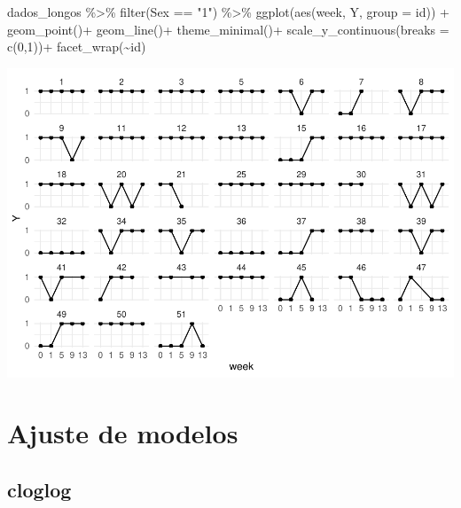 \documentclass[
]{article}
\newenvironment{Shaded}{\begin{snugshade}}{\end{snugshade}}
\newcommand{\AttributeTok}[1]{\textcolor[rgb]{0.80,0.80,0.80}{#1}}
\newcommand{\DecValTok}[1]{\textcolor[rgb]{0.86,0.86,0.80}{#1}}
\newcommand{\FunctionTok}[1]{\textcolor[rgb]{0.94,0.94,0.56}{#1}}
\newcommand{\NormalTok}[1]{\textcolor[rgb]{0.80,0.80,0.80}{#1}}
\newcommand{\OtherTok}[1]{\textcolor[rgb]{0.94,0.94,0.56}{#1}}
\newcommand{\SpecialCharTok}[1]{\textcolor[rgb]{0.86,0.64,0.64}{#1}}
\newcommand{\StringTok}[1]{\textcolor[rgb]{0.80,0.58,0.58}{#1}}
\begin{document}
\begin{Shaded}
\begin{Highlighting}[]
\NormalTok{dados\_longos }\SpecialCharTok{\%\textgreater{}\%} \FunctionTok{filter}\NormalTok{(Sex }\SpecialCharTok{==} \StringTok{"1"}\NormalTok{) }\SpecialCharTok{\%\textgreater{}\%}
  \FunctionTok{ggplot}\NormalTok{(}\FunctionTok{aes}\NormalTok{(week, Y, }\AttributeTok{group =}\NormalTok{ id)) }\SpecialCharTok{+}
  \FunctionTok{geom\_point}\NormalTok{()}\SpecialCharTok{+}
  \FunctionTok{geom\_line}\NormalTok{()}\SpecialCharTok{+}
  \FunctionTok{theme\_minimal}\NormalTok{()}\SpecialCharTok{+}
  \FunctionTok{scale\_y\_continuous}\NormalTok{(}\AttributeTok{breaks =} \FunctionTok{c}\NormalTok{(}\DecValTok{0}\NormalTok{,}\DecValTok{1}\NormalTok{))}\SpecialCharTok{+}
  \FunctionTok{facet\_wrap}\NormalTok{(}\SpecialCharTok{\textasciitilde{}}\NormalTok{id)}
\end{Highlighting}
\end{Shaded}

\includegraphics{EDA__files/figure-latex/unnamed-chunk-8-1.pdf}

\hypertarget{ajuste-de-modelos}{%
\section{Ajuste de modelos}\label{ajuste-de-modelos}}

\hypertarget{cloglog}{%
\subsection{cloglog}\label{cloglog}}

\begin{Shaded}
\end{Shaded}
\end{document}
